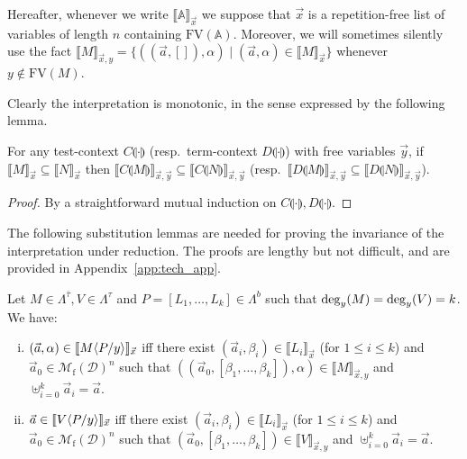 \documentclass{LMCS}
\newcommand{\st}{ \mid }
\renewcommand{\hole}[1]{\llparenthesis #1\rrparenthesis}
\newcommand{\FV}{\mathrm{FV}}
\newcommand{\Set}[1]{\Lambda^{#1}}
\newcommand{\Int}[1]{\llbracket #1\rrbracket} \newcommand{\trm}[1]{#1^{\textrm{--}}}
\newcommand{\Mfin}[1]{\mathcal{M}_{\mathrm{f}}(#1)}
\newcommand{\mcup}{\uplus}
\newcommand{\seq}[1]{\vec{#1}}
\newcommand{\sA}{\mathbb{A}}
\newcommand{\gt}{\ensuremath{\tau}}
\newcommand{\gto}{\ensuremath{\bar\tau}}
\newcommand{\cD}{\mathcal{D}}
\begin{document}
\begin{conv} Hereafter, whenever we write $\Int{\sA}_{\seq x}$ we suppose that $\seq x$ 
is a repetition-free list of variables of length $n$ containing $\FV(\sA)$.
Moreover, we will sometimes silently use the fact $\Int{M}_{\seq x,y}=  \{((\seq a,[]),\alpha) \st (\seq a,\alpha)\in \Int{M}_{\seq x}\}$
whenever $y\notin\FV(M)$.
\end{conv}

Clearly the interpretation is monotonic, in the sense expressed by the following lemma.

\begin{lem}\label{lemma:monotonicity}
For any test-context $C\hole{\cdot}$ (resp.\ term-context $D\hole{\cdot}$) with free variables $\seq y$,
if $\Int{M}_{\seq x}\subseteq\Int{N}_{\seq x}$ then
$\Int{C\hole{M}}_{\seq x,\seq y}\subseteq\Int{C\hole{N}}_{\seq x,\seq y}$ (resp.\ $\Int{D\hole{M}}_{\seq x,\seq y}\subseteq\Int{D\hole{N}}_{\seq x,\seq y}$).
\end{lem}

\begin{proof} By a straightforward mutual induction on $C\hole{\cdot},D\hole{\cdot}$.
\end{proof}

The following substitution lemmas are needed for proving the invariance
of the interpretation under reduction.
The proofs are lengthy but not difficult, and are provided in Appendix~\ref{app:tech_app}.

\begin{lem}\label{lemma:lsubst}
Let $M\in\Set{\gto}, V\in\Set{\gt}$ and $P = [L_1,\ldots,L_k]\in\Set{b}$
such that $\mathrm{deg}_{y}(M) = \mathrm{deg}_{y}(V) = k$. 
We have:
\begin{enumerate}[(i)]
\item 
$(\seq a, \alpha)\in \Int{M\lsubst{y}{P}}_{\seq x}$ iff there exist
$(\seq a_i,\beta_i)\in\Int{L_i}_{\seq x}$ (for $1\le i \le k$) and
$\seq a_0\in\Mfin{\cD}^n$ such that
$((\seq a_0,[\beta_1,\ldots,\beta_k]), \alpha)\in\Int{M}_{\seq x,y}$
and 
$\mcup_{i=0}^{k} \seq a_i=\seq a$.
\item 
$\seq a\in \Int{V\lsubst{y}{P}}_{\seq x}$  iff there exist
$(\seq a_i,\beta_i)\in\Int{L_i}_{\seq x}$ (for $1\le i \le k$) and
$\seq a_0\in\Mfin{\cD}^n$ such that
$(\seq a_0,[\beta_1,\ldots,\beta_k])\in\Int{V}_{\seq x,y}$ and 
$\mcup_{i=0}^{k} \seq a_i=\seq a$.
\end{enumerate}
\end{lem}
\end{document}
